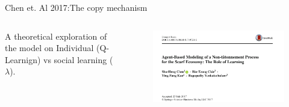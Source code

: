 \documentclass[12pt, notes=show]{beamer}
\begin{document}
\begin{frame}{Chen et. Al 2017:The copy mechanism}
	\begin{columns}
		\begin{column}{.5\textwidth}
    \footnotesize
    A theoretical exploration of the model on Individual (Q-Learnign) vs social learning ($\lambda$).
		\end{column}
		\begin{column}{.5\textwidth}
    \begin{figure}
	\includegraphics[width=\textwidth]{images/chenetAlComput.png}
    \end{figure}
		\end{column}
	\end{columns}
    \footnotesize
    \vspace{.5cm}




\end{frame}
\end{document}
